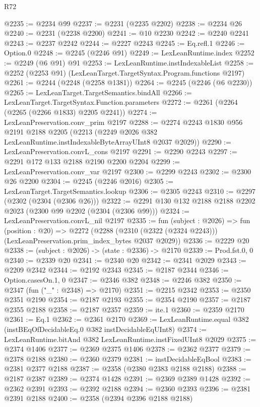 \begin{lexlean}{R72}
\begin{coremodule}
@2235 := @2234 @99
@2237 := @2231 (@2235 @2202)
@2238 := @2234 @26
@2240 := @2231 (@2238 @2200)
@2241 := @10 @2230
@2242 := @2240 @2241
@2243 := @2237 @2242
@2244 := @2227 @2243
@2245 := Eq.refl.{1}
@2246 := Option.{0}
@2248 := @2245 (@2246 @91)
@2249 := LexLeanRuntime.index
@2252 := @2249 (@6 @91) @91
@2253 := LexLeanRuntime.instIndexableList
@2258 := @2252 (@2253 @91) (LexLeanTarget.TargetSyntax.Program.functions @2197)
@2261 := @2244 (@2248 (@2258 @1381))
@2264 := @2245 (@2246 (@6 @2230))
@2265 := LexLeanTarget.TargetSemantics.bindAll
@2266 := LexLeanTarget.TargetSyntax.Function.parameters
@2272 := @2261 (@2264 (@2265 (@2266 @1833) @2205 @2241))
@2274 := LexLeanPreservation.conv_prim @2197
@2288 := @2274
    @2243
    @1830
    @956
    @2191
    @2188
    @2205
    (@2213 (@2249 @2026 @382 LexLeanRuntime.instIndexableByteArrayUInt8 @2037 @2029))
@2290 := LexLeanPreservation.convL_cons @2197
@2291 := @2290 @2243
@2297 := @2291 @172 @133 @2188 @2190 @2200 @2204
@2299 := LexLeanPreservation.conv_var @2197
@2300 := @2299 @2243
@2302 := @2300 @26 @2200
@2304 := @2245 (@2246 @2016)
@2305 := LexLeanTarget.TargetSemantics.lookup
@2306 := @2305 @2243
@2310 := @2297 (@2302 (@2304 (@2306 @26)))
@2322 := @2291 @130 @132 @2188 @2188 @2202 @2023 (@2300 @99 @2202 (@2304 (@2306 @99)))
@2324 := LexLeanPreservation.convL_nil @2197
@2335 := fun (subject : @2026) =>
  fun (position : @20) =>
  @2272 (@2288 (@2310 (@2322 (@2324 @2243))) (LexLeanPreservation.prim_index_bytes @2037 @2029))
@2336 := @2229 @20
@2338 := (subject : @2026) -> (state : @2336) -> @2170
@2339 := Prod.fst.{0, 0}
@2340 := @2339 @20
@2341 := @2340 @20
@2342 := @2341 @2029
@2343 := @2209 @2342
@2344 := @2192 @2343
@2345 := @2187 @2344
@2346 := Option.casesOn.{1, 0}
@2347 := @2346 @382
@2348 := @2246 @382
@2350 := @2347 (fun ("_" : @2348) => @2170)
@2351 := @2215 @2342
@2353 := @2350 @2351 @2190
@2354 := @2187 @2193
@2355 := @2354 @2190
@2357 := @2187 @2355 @2188
@2358 := @2187 @2357
@2359 := ite.{1}
@2360 := @2359 @2170
@2361 := Eq.{1}
@2362 := @2361 @2170
@2369 := LexLeanRuntime.equal @382 (instBEqOfDecidableEq.{0} @382 instDecidableEqUInt8)
@2374 := LexLeanRuntime.bitAnd @382 LexLeanRuntime.instFixedUInt8 @2029
@2375 := @2374 @1406
@2377 := @2369 @2375 @1406
@2378 := @2362 @2377
@2379 := @2378 @2188
@2380 := @2360 @2379
@2381 := instDecidableEqBool
@2383 := @2381 @2377 @2188
@2387 := @2358 (@2380 @2383 @2188 @2188)
@2388 := @2187 @2387
@2389 := @2374 @1428
@2391 := @2369 @2389 @1428
@2392 := @2362 @2391
@2393 := @2392 @2188
@2394 := @2360 @2393
@2396 := @2381 @2391 @2188
@2400 := @2358 (@2394 @2396 @2188 @2188)

\end{coremodule}
\end{lexlean}

